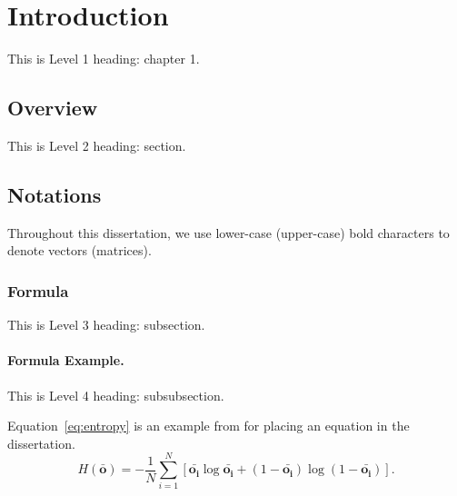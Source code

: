 \chapter{Introduction}
\pagestyle{plain}

This is Level 1 heading: chapter 1.

\section{Overview}
This is Level 2 heading: section.

\section{Notations}
Throughout this dissertation, we use lower-case (upper-case) bold characters to denote vectors (matrices). 

\subsection{Formula}
This is Level 3 heading: subsection.

\subsubsection{Formula Example.}
This is Level 4 heading: subsubsection.

Equation~\eqref{eq:entropy} is an example from \cite{xie2024scope, xie2023stochastic} for placing an equation in the dissertation. 
\begin{equation}
        H(\bar{\mathbf{o}}) = -\frac{1}{N} \sum_{i=1}^{N}{\left[ \bar{\mathbf{o_i}} \log \bar{\mathbf{o_i}} + (1-\bar{\mathbf{o_i}}) \log (1 -\bar{\mathbf{o_i}}) \right]}.
        \label{eq:entropy}
\end{equation}